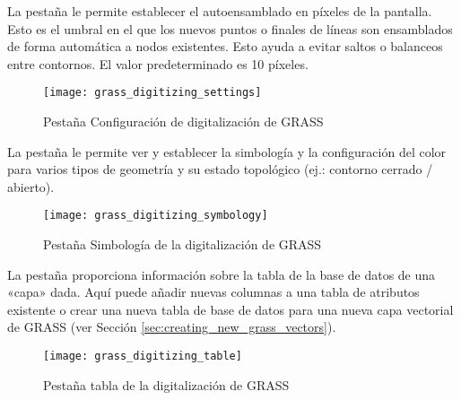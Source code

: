 La pestaña  le permite establecer el autoensamblado en píxeles de la pantalla. Esto es el umbral en 
el que los nuevos puntos o finales de líneas son ensamblados de forma automática a nodos existentes. Esto ayuda a evitar 
saltos o balanceos entre contornos. El valor predeterminado es 10 píxeles.

\begin{figure}[h]
 \begin{center}
 \caption{Pestaña Configuración de digitalización de GRASS \nixcaption}\label{fig:grass_digitizing_settings}
 \texttt{[image: grass\_digitizing\_settings]}
 \end{center}
\end{figure}


La pestaña  le permite ver y establecer la simbología y la configuración del color para varios tipos de geometría y su estado topológico (ej.: contorno cerrado / abierto).

\begin{figure}[h]
 \begin{center}
 \caption{Pestaña Simbología de la digitalización de GRASS \nixcaption}\label{fig:grass_digitizing_symbology}
 \texttt{[image: grass\_digitizing\_symbology]}
 \end{center}
\end{figure}

 

La pestaña  proporciona información sobre la tabla de la base de datos de una «capa» dada. Aquí puede añadir 
nuevas columnas a una tabla de atributos existente o crear  una nueva tabla de base de datos para una nueva capa 
vectorial de GRASS (ver Sección 
\ref{sec:creating_new_grass_vectors}).

\begin{figure}[h]
 \begin{center}
 \caption{Pestaña tabla de la digitalización de GRASS \nixcaption}\label{fig:grass_digitizing_table}
 \texttt{[image: grass\_digitizing\_table]}
 \end{center}
\end{figure}

\begin{Tip}\caption{\textsc{Permisos de edición de GRASS}}
\end{Tip} 

